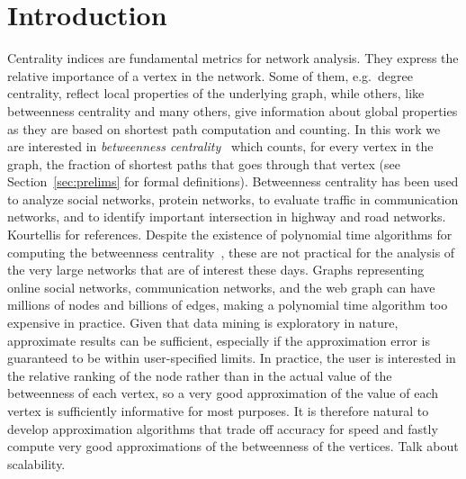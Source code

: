 \section{Introduction}\label{sec:intro}
Centrality indices are fundamental metrics for network analysis. They express the
relative importance of a vertex in the network. Some of them, e.g.~degree
centrality, reflect local properties of the underlying graph, while others,
like betweenness centrality and many others, give information about global
properties as they are based on shortest path computation and counting. In this
work we are interested in \emph{betweenness
centrality}~\citep{Anthonisse71,Freeman77} which counts, for every vertex in the
graph, the fraction of shortest paths that goes through that vertex (see
Section~\ref{sec:prelims} for formal definitions). Betweenness centrality has
been used to analyze social networks, protein networks, to evaluate traffic in
communication networks, and to identify important intersection in highway and
road networks. \XXX Kourtellis for references. Despite the existence of
polynomial time algorithms for computing the betweenness
centrality~\citep{Brandes01}, these are not practical for the analysis of the
very large networks that are of interest these days. Graphs representing online
social networks, communication networks, and the web graph can have millions of
nodes and billions of edges, making a polynomial time algorithm too expensive in
practice. Given that data mining is exploratory in nature, approximate results
can be sufficient, especially if the approximation error is guaranteed to be
within user-specified limits. In practice, the user is interested in the
relative ranking of the node rather than in the actual value of the betweenness
of each vertex, so a very good approximation of the value of each vertex is
sufficiently informative for most purposes. It is therefore natural to develop
approximation algorithms that trade off accuracy for speed and fastly compute
very good approximations of the betweenness of the vertices. 
\XXX Talk about scalability.


